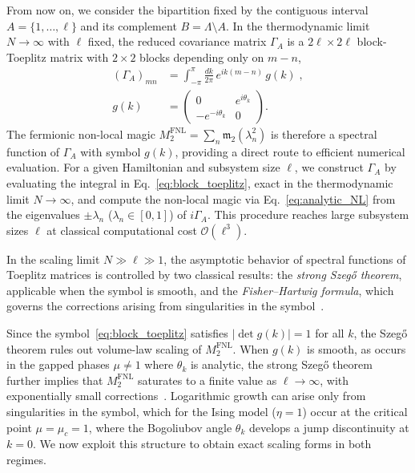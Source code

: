 \documentclass[prx,twocolumn,superscriptaddress,aps,10pt, frontmatterverbose, reprint,footinbib,longbibliography=true]{revtex4-2}
\providecommand{\DIFdeltex}[1]{} %
\providecommand{\DIFdelbegin}{} %
\providecommand{\DIFdelend}{} %
\providecommand{\DIFdel}[1]{\texorpdfstring{\DIFdeltex{#1}}{}} %
\begin{document}
From now on, we consider the bipartition fixed by the contiguous interval $A=\{1,\dots,\ell\}$ and its complement $B=\Lambda\setminus A$.
In the thermodynamic limit $N\to\infty$ with $\ell$ fixed, the reduced covariance matrix $\Gamma_A$ is a $2\ell\times 2\ell$ block-Toeplitz matrix with $2\times 2$ blocks depending only on $m-n$,
\begin{equation}
\begin{split}
    (\Gamma_A)_{mn} &= \int_{-\pi}^{\pi}\frac{dk}{2\pi}\,e^{ik(m-n)}\,g(k)\;,
    \\
    g(k) &= \begin{pmatrix} 0 & e^{i\theta_k} \\ -e^{-i\theta_k} & 0 \end{pmatrix}.
\end{split}
\label{eq:block_toeplitz}
\end{equation}
The fermionic non-local magic $M_2^{\mathrm{FNL}} = \sum_n \mathfrak{m}_2(\lambda_n^2)$ is therefore a spectral function of $\Gamma_A$ with symbol $g(k)$, providing a direct route to efficient numerical evaluation.
For a given Hamiltonian and subsystem size $\ell$, we construct $\Gamma_A$ by evaluating the integral in Eq.~\eqref{eq:block_toeplitz}, exact in the thermodynamic limit $N\to\infty$, and compute the non-local magic via Eq.~\eqref{eq:analytic_NL} from the eigenvalues $\pm\lambda_n$ ($\lambda_n\in[0,1]$) of $i\Gamma_A$.
This procedure reaches large subsystem sizes $\ell$ at classical computational cost $\mathcal{O}(\ell^3)$.

In the scaling limit $N\gg \ell\gg 1$, the asymptotic behavior of spectral functions of Toeplitz matrices is controlled by two classical results: the \emph{strong Szeg\H{o} theorem}, applicable when the symbol is smooth, and the \emph{Fisher--Hartwig formula}, which governs the corrections arising from singularities in the symbol~\cite{Jin_2004,Its_2005}.

Since the symbol~\eqref{eq:block_toeplitz} satisfies $|\det g(k)| = 1$ for all $k$, the Szeg\H{o} theorem rules out volume-law scaling of $M_2^{\mathrm{FNL}}$.
When $g(k)$ is smooth, as occurs in the gapped phases $\mu \neq 1$ where $\theta_k$ is analytic, the strong Szeg\H{o} theorem further implies that $M_2^{\mathrm{FNL}}$ saturates to a finite value as $\ell \to \infty$, with exponentially small corrections~\cite{simon2010szego}.
Logarithmic growth can arise only from singularities in the symbol, which for the Ising model ($\eta=1$) occur at the critical point $\mu = \mu_c = 1$, where the Bogoliubov angle $\theta_k$ develops a jump discontinuity at $k = 0$\DIFdelbegin \DIFdel{(and $k = \pi$)}\DIFdelend .
We now exploit this structure to obtain exact scaling forms in both regimes.
\end{document}
